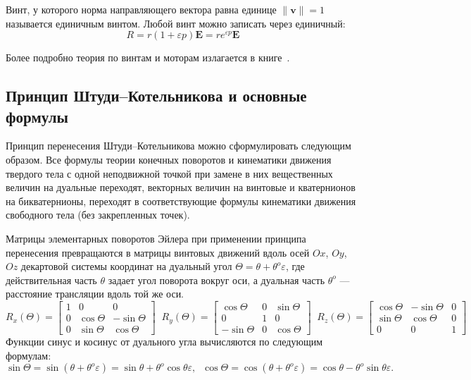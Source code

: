 \documentclass[%
]{ittmm}
\begin{document}
Винт, у которого норма направляющего вектора равна единице $\| \mathbf{v} \| = 1$ называется единичным винтом. Любой винт можно записать через единичный:
\begin{equation*}
  R = r(1+\varepsilon p)\mathbf{E} = r e^{\varepsilon p}\mathbf{E}
\end{equation*}

Более подробно теория по винтам и моторам излагается в книге~\cite{Dimentberg:1965}.

\subsection{Принцип Штуди--Котельникова и основные формулы}

Принцип перенесения Штуди--Котельникова можно сформулировать следующим образом. Все формулы теории конечных поворотов и кинематики движения твердого тела с одной неподвижной точкой при замене в них вещественных величин на дуальные переходят, векторных величин на винтовые и кватернионов на бикватернионы, переходят в соответствующие формулы кинематики движения свободного тела (без закрепленных точек).

Матрицы элементарных поворотов Эйлера при применении принципа перенесения превращаются в матрицы винтовых движений вдоль осей $Ox$, $Oy$, $Oz$ декартовой системы координат на дуальный угол $\Theta = \theta + \theta^o \varepsilon$, где действительная часть $\theta$ задает угол поворота вокруг оси, а дуальная часть $\theta^o$ — расстояние трансляции вдоль той же оси.
\begin{equation*}
  R_x(\Theta) = 
  \begin{bmatrix}
    1 & 0 & 0\\
    0 & \cos{\Theta} & -\sin{\Theta}\\
    0 & \sin{\Theta} & \cos{\Theta}
  \end{bmatrix}
  \;\;
  R_y(\Theta) = 
  \begin{bmatrix}
    \cos\Theta & 0 & \sin\Theta\\
    0 & 1 & 0\\
    -\sin\Theta & 0 & \cos\Theta
  \end{bmatrix}
  \;\;
  R_z(\Theta) = 
  \begin{bmatrix}
    \cos\Theta & -\sin\Theta & 0\\
    \sin\Theta & \cos\Theta & 0\\
    0 & 0 & 1
  \end{bmatrix}
\end{equation*}
Функции синус и косинус от дуального угла вычисляются по следующим формулам:
\begin{equation*}
  \sin\Theta = \sin(\theta + \theta^o \varepsilon) = \sin\theta + \theta^o \cos\theta \varepsilon,\;\;
  \cos\Theta = \cos(\theta + \theta^o \varepsilon) = \cos\theta - \theta^o \sin\theta \varepsilon.
\end{equation*}
\end{document}
